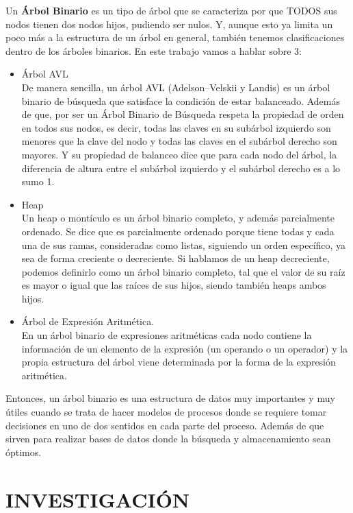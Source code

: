 \documentclass{report}
\begin{document}
Un \textbf{Árbol Binario} es un tipo de árbol que se caracteriza por que TODOS sus nodos tienen dos nodos hijos, pudiendo ser nulos. Y, aunque esto ya limita un poco más a la estructura de un árbol en general, también tenemos clasificaciones dentro de los árboles binarios. En este trabajo vamos a hablar sobre 3:
\begin{itemize}
    \item Árbol AVL\\De manera sencilla, un árbol AVL (Adelson–Velskii y Landis) es un árbol binario de búsqueda  que satisface la condición de estar balanceado. Además de que, por ser un Árbol Binario de Búsqueda respeta la propiedad de orden en todos sus nodos, es decir, todas las claves en su subárbol izquierdo son menores que la clave del nodo y todas las claves en el subárbol derecho son mayores. Y su propiedad de balanceo dice que para cada nodo del árbol, la diferencia de altura entre el subárbol izquierdo y el subárbol derecho es a lo sumo 1.
    \item Heap\\Un heap o montículo es un árbol binario completo, y además parcialmente ordenado. Se dice que es parcialmente ordenado porque tiene todas y cada una de sus ramas, consideradas como listas, siguiendo un orden específico, ya sea de forma creciente o decreciente. Si hablamos de un heap decreciente, podemos definirlo como un árbol binario completo, tal que el valor de su raíz es mayor o igual que las raíces de sus hijos, siendo también heaps ambos hijos.
    \item Árbol de Expresión Aritmética.\\En un árbol binario de expresiones aritméticas cada nodo contiene la información de un elemento de la expresión (un operando o un operador) y la propia estructura del árbol viene determinada por la forma de la expresión aritmética.
\end{itemize}
Entonces, un árbol binario es una estructura de datos muy importantes y muy útiles cuando se trata de hacer modelos de procesos donde se requiere tomar decisiones en uno de dos sentidos en cada parte del proceso. Además de que sirven para realizar bases de datos donde la búsqueda y almacenamiento sean óptimos.
\section{INVESTIGACIÓN}
\end{document}
